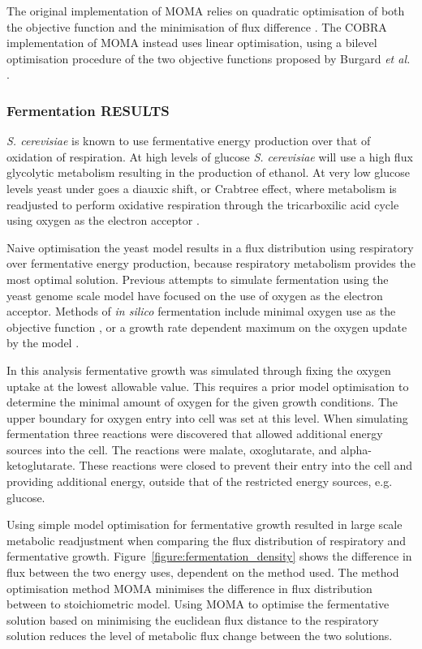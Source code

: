 The original implementation of MOMA relies on quadratic optimisation of both the objective function and the minimisation of flux difference \cite{segre2002}. The COBRA implementation of MOMA instead uses linear optimisation, using a bilevel optimisation procedure of the two objective functions proposed by Burgard \emph{et al.} \cite{burgard2003,becker2007}.

\subsubsection{Fermentation RESULTS}



\emph{S. cerevisiae} is known to use fermentative energy production over that of oxidation of respiration. At high levels of glucose \emph{S. cerevisiae} will use a high flux glycolytic metabolism resulting in the production of ethanol. At very low glucose levels yeast under goes a diauxic shift, or Crabtree effect, where metabolism is readjusted to perform oxidative respiration through the tricarboxilic acid cycle using oxygen as the electron acceptor \cite{kolkman2005,kolkman2006}.

Naive optimisation the yeast model results in a flux distribution using respiratory over fermentative energy production, because respiratory metabolism provides the most optimal solution. Previous attempts to simulate fermentation using the yeast genome scale model have focused on the use of oxygen as the electron acceptor. Methods of \emph{in silico} fermentation include minimal oxygen use as the objective function \cite{cakir2007}, or a growth rate dependent maximum on the oxygen update by the model \cite{famili2003}.

In this analysis fermentative growth was simulated through fixing the oxygen uptake at the lowest allowable value. This requires a prior model optimisation to determine the minimal amount of oxygen for the given growth conditions. The upper boundary for oxygen entry into cell was set at this level. When simulating fermentation three reactions were discovered that allowed additional energy sources into the cell. The reactions were malate, oxoglutarate, and alpha-ketoglutarate. These reactions were closed to prevent their entry into the cell and providing additional energy, outside that of the restricted energy sources, e.g. glucose.

Using simple model optimisation for fermentative growth resulted in large scale metabolic readjustment when comparing the flux distribution of respiratory and fermentative growth. Figure~\vref{figure:fermentation_density} shows the difference in flux between the two energy uses, dependent on the method used. The method optimisation method MOMA \cite{segre2002} minimises the difference in flux distribution between to stoichiometric model. Using MOMA to optimise the fermentative solution based on minimising the euclidean flux distance to the respiratory solution reduces the level of metabolic flux change between the two solutions.

